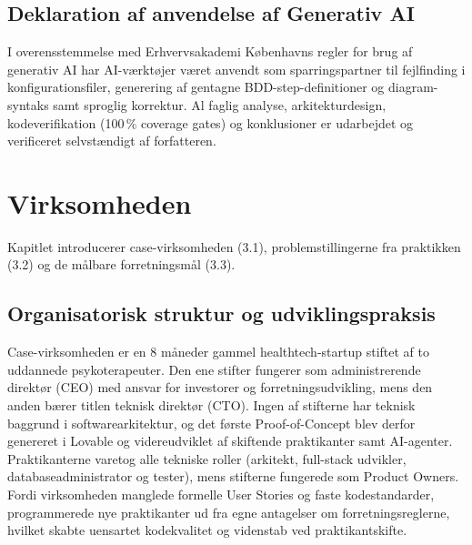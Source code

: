 \documentclass[11pt,a4paper]{article}
\begin{document}
\subsection{Deklaration af anvendelse af Generativ AI}
I overensstemmelse med Erhvervsakademi Københavns regler for brug af generativ AI \cite{ek_ai_regler2024, ek_genai_rammer2024} har AI-værktøjer været anvendt som sparringspartner til fejlfinding i konfigurationsfiler, generering af gentagne BDD-step-definitioner og diagram-syntaks samt sproglig korrektur. Al faglig analyse, arkitekturdesign, kodeverifikation (100\,\% coverage gates) og konklusioner er udarbejdet og verificeret selvstændigt af forfatteren.

\section{Virksomheden}
Kapitlet introducerer case-virksomheden (3.1), problemstillingerne fra praktikken (3.2) og de målbare forretningsmål (3.3).

\subsection{Organisatorisk struktur og udviklingspraksis}
Case-virksomheden er en 8 måneder gammel healthtech-startup stiftet af to uddannede psykoterapeuter. Den ene stifter fungerer som administrerende direktør (CEO) med ansvar for investorer og forretningsudvikling, mens den anden bærer titlen teknisk direktør (CTO). Ingen af stifterne har teknisk baggrund i softwarearkitektur, og det første Proof-of-Concept blev derfor genereret i Lovable og videreudviklet af skiftende praktikanter samt AI-agenter. Praktikanterne varetog alle tekniske roller (arkitekt, full-stack udvikler, databaseadministrator og tester), mens stifterne fungerede som Product Owners. Fordi virksomheden manglede formelle User Stories og faste kodestandarder, programmerede nye praktikanter ud fra egne antagelser om forretningsreglerne, hvilket skabte uensartet kodekvalitet og videnstab ved praktikantskifte.
\end{document}
